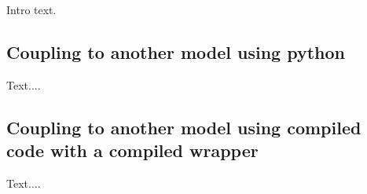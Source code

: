 Intro text.


\subsection{Coupling to another model using python}
 Text....
 
 
 
\subsection{Coupling to another model using compiled code with a compiled wrapper}
 Text....
 